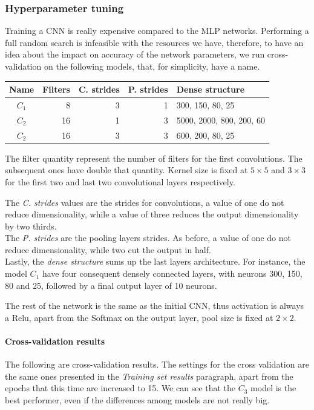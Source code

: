 \subsubsection{Hyperparameter tuning}
Training a CNN is really expensive compared to the MLP networks.
Performing a full random search is infeasible with the resources we have, therefore, 
to have an idea about the impact on accuracy of the network parameters, we run 
cross-validation on the following models, that, for simplicity, have a name.
\begin{center}
    \begin{tabular}{ |c|r|r|r|l| } 
        \hline
        Name & Filters & C. strides & P. strides & Dense structure \\
        \hline
        $C_1$ & 8 & 3 & 1 & 300, 150, 80, 25 \\
        $C_2$ & 16 & 1 & 3 & 5000, 2000, 800, 200, 60 \\
        $C_2$ & 16 & 3 & 3 & 600, 200, 80, 25 \\
        \hline
    \end{tabular}
\end{center}

The filter quantity represent the number of filters for the first convolutions. 
The subsequent ones have double that quantity.
Kernel size is fixed at $5 \times 5$ and $3 \times 3$ for the first two and last 
two convolutional layers respectively. 

The \emph{C. strides} values are the strides for convolutions, a value of one do not 
reduce dimensionality, while a value of three reduces the output dimensionality by two thirds.\\
The \emph{P. strides} are the pooling layers strides. As before, a value of one do not reduce
dimensionality, while two cut the output in half.\\
Lastly, the \emph{dense structure} sums up the last layers architecture. For instance, 
the model $C_1$ have four consequent densely connected layers, with neurons 300, 150, 80 and 
25, followed by a final output layer of 10 neurons.

The rest of the network is the same as the initial CNN, thus activation is always a Relu, 
apart from the Softmax on the output layer, pool size is fixed at $2 \times 2$.

\paragraph{Cross-validation results}
The following are cross-validation results. 
The settings for the cross validation are the same ones presented in the \emph{Training set results}
paragraph, apart from the epochs that this time are increased to 15.
We can see that the $C_3$ model is the best performer, even if the differences among models are not really big.

